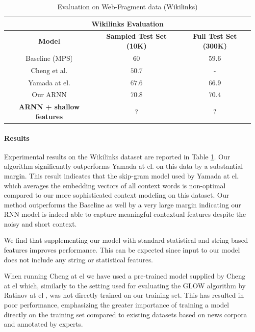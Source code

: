 \documentclass[11pt]{article}
\begin{document}
\begin{table}[t]
	\begin{center}
		\begin{tabular}{|c| c | c | }
			\hline \multicolumn{3}{|c|}{Wikilinks Evaluation} \\
			\hline \bf Model               & \bf Sampled Test Set (10K)  & \bf Full Test Set (300K)  \\
			Baseline (MPS)                 & $60$   & $59.6$ \\
			Cheng et al.                   & $50.7$ & - \\
			Yamada at el.                  & $67.6$ & $66.9$ \\
			\hline
			Our ARNN                       & $70.8$ & $70.4$ \\
			\bf ARNN + shallow features    & ?      &  $?$ \\
			\hline
		\end{tabular}
	\end{center}
	\caption{\label{tab:wikilink} Evaluation on Web-Fragment data (Wikilinks)}
\end{table}


\paragraph{Results}
Experimental results on the Wikilinks dataset are reported in Table \ref{tab:wikilink}. Our algorithm significantly outperforms Yamada at el. on this data by a substantial margin. This result indicates that the skip-gram model used by Yamada at el. which averages the embedding vectors of all context words is non-optimal compared to our more sophisticated context modeling on this dataset. Our method outperforms the Baseline as well by a very large margin indicating our RNN model is indeed able to capture meaningful contextual features despite the noisy and short context. 

We find that supplementing our model with standard statistical and string based features improves performance. This can be expected since input to our model does not include any string or statistical features. 

When running Cheng at el  we have used a pre-trained model supplied by Cheng at el which, similarly to the setting used for evaluating the GLOW algorithm by Ratinov at el \cite{ratinov2011glow}, was not directly trained on our training set. This has resulted in poor performance, emphasizing the greater importance of training a model directly on the training set compared to existing datasets based on news corpora and annotated by experts.
\end{document}
